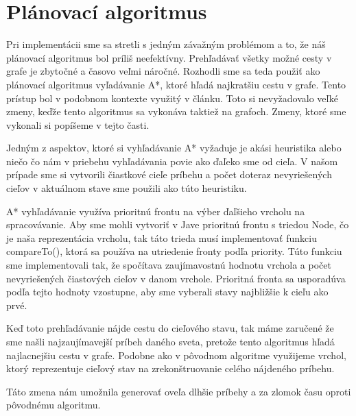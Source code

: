 \section{Plánovací algoritmus}
Pri implementácii sme sa stretli s jedným závažným problémom a to, že náš plánovací algoritmus bol príliš neefektívny. Prehľadávať všetky možné cesty v grafe je zbytočné a časovo veľmi náročné. Rozhodli sme sa teda použiť ako plánovací algoritmus vyľadávanie A*, ktoré hľadá najkratšiu cestu v grafe. Tento prístup bol v podobnom kontexte využitý v článku\cite{astar}. Toto si nevyžadovalo veľké zmeny, keďže tento algoritmus sa vykonáva taktiež na grafoch. Zmeny, ktoré sme vykonali si popíšeme v tejto časti.\par
Jedným z aspektov, ktoré si vyhľadávanie A* vyžaduje je akási heuristika alebo niečo čo nám v priebehu vyhľadávania povie ako ďaľeko sme od cieľa. V našom prípade sme si vytvorili čiastkové cieľe príbehu a počet doteraz nevyriešených cieľov v aktuálnom stave sme použili ako túto heuristiku.\par
A* vyhľadávanie využíva prioritnú frontu na výber ďaľšieho vrcholu na spracovávanie. Aby sme mohli vytvoriť v Jave prioritnú frontu s triedou Node, čo je naša reprezentácia vrcholu, tak táto trieda musí implementovať funkciu compareTo(), ktorá sa používa na utriedenie fronty podľa priority. Túto funkciu sme implementovali tak, že spočítava zaujímavostnú hodnotu vrchola a počet nevyriešených čiastových cieľov v danom vrchole. Prioritná fronta sa usporadúva podľa tejto hodnoty vzostupne, aby sme vyberali stavy najbližšie k cieľu ako prvé.\par
Keď toto prehľadávanie nájde cestu do cieľového stavu, tak máme zaručené že sme našli najzaujímavejší príbeh daného sveta, pretože tento algoritmus hľadá najlacnejšiu cestu v grafe. Podobne ako v pôvodnom algoritme využijeme vrchol, ktorý reprezentuje cieľový stav na zrekonštruovanie celého nájdeného príbehu.\par
Táto zmena nám umožnila generovať oveľa dlhšie príbehy a za zlomok času oproti pôvodnému algoritmu.
